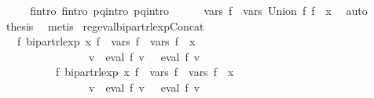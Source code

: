 \begin{isabellebody}
\ \ \isamarkupfalse%
\ \isamarkupfalse%
\ f{}{\isacharprime}{\kern0pt}{\isacharunderscore}{\kern0pt}intro\ f{}{\isacharprime}{\kern0pt}{\isacharunderscore}{\kern0pt}intro\ p{}{\isacharunderscore}{\kern0pt}q{}{\isacharunderscore}{\kern0pt}intro\ p{}{\isacharunderscore}{\kern0pt}q{}{\isacharunderscore}{\kern0pt}intro\isanewline
\ \ \ \ \isamarkupfalse%
\ {\isachardoublequoteopen}vars\ {\isacharquery}{\kern0pt}f{\isacharprime}{\kern0pt}\ {\isacharequal}{\kern0pt}\ vars\ {\isacharparenleft}{\kern0pt}Union\ f{}\ f{}{\isacharparenright}{\kern0pt}\ {\isasymunion}\ {\isacharbraceleft}{\kern0pt}x{\isacharbraceright}{\kern0pt}{\isachardoublequoteclose}\ \isamarkupfalse%
\ auto\isanewline
\ \ \isamarkupfalse%
\ \isamarkupfalse%
\ {\isacharquery}{\kern0pt}thesis\ \isamarkupfalse%
\ metis\isanewline
{}\isamarkupfalse%
%
\endisatagproof
{\isafoldproof}%
%
\isadelimproof
\isanewline
%
\endisadelimproof
\isanewline
{}\isamarkupfalse%
\ reg{\isacharunderscore}{\kern0pt}eval{\isacharunderscore}{\kern0pt}bipart{\isacharunderscore}{\kern0pt}rlexp{\isacharunderscore}{\kern0pt}Concat{\isacharcolon}{\kern0pt}\isanewline
\ \ \ {\isachardoublequoteopen}{\isasymexists}f{\isacharprime}{\kern0pt}{\isachardot}{\kern0pt}\ bipart{\isacharunderscore}{\kern0pt}rlexp\ x\ f{\isacharprime}{\kern0pt}\ {\isasymand}\ vars\ f{\isacharprime}{\kern0pt}\ {\isacharequal}{\kern0pt}\ vars\ f{}\ {\isasymunion}\ {\isacharbraceleft}{\kern0pt}x{\isacharbraceright}{\kern0pt}\ {\isasymand}\isanewline
\ \ \ \ \ \ \ \ \ \ \ \ \ \ \ \ {\isacharparenleft}{\kern0pt}{\isasymforall}v{\isachardot}{\kern0pt}\ {\isasymPsi}\ {\isacharparenleft}{\kern0pt}eval\ f{}\ v{\isacharparenright}{\kern0pt}\ {\isacharequal}{\kern0pt}\ {\isasymPsi}\ {\isacharparenleft}{\kern0pt}eval\ f{\isacharprime}{\kern0pt}\ v{\isacharparenright}{\kern0pt}{\isacharparenright}{\kern0pt}{\isachardoublequoteclose}\isanewline
\ \ \ \ \ \ \ \ \ \ {\isachardoublequoteopen}{\isasymexists}f{\isacharprime}{\kern0pt}{\isachardot}{\kern0pt}\ bipart{\isacharunderscore}{\kern0pt}rlexp\ x\ f{\isacharprime}{\kern0pt}\ {\isasymand}\ vars\ f{\isacharprime}{\kern0pt}\ {\isacharequal}{\kern0pt}\ vars\ f{}\ {\isasymunion}\ {\isacharbraceleft}{\kern0pt}x{\isacharbraceright}{\kern0pt}\ {\isasymand}\isanewline
\ \ \ \ \ \ \ \ \ \ \ \ \ \ \ \ {\isacharparenleft}{\kern0pt}{\isasymforall}v{\isachardot}{\kern0pt}\ {\isasymPsi}\ {\isacharparenleft}{\kern0pt}eval\ f{}\ v{\isacharparenright}{\kern0pt}\ {\isacharequal}{\kern0pt}\ {\isasymPsi}\ {\isacharparenleft}{\kern0pt}eval\ f{\isacharprime}{\kern0pt}\ v{\isacharparenright}{\kern0pt}{\isacharparenright}{\kern0pt}{\isachardoublequoteclose}\isanewline

\end{isabellebody}
